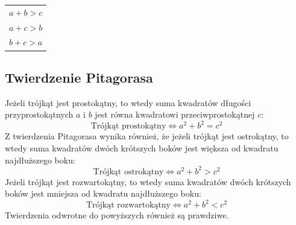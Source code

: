 \documentclass[14pt,a4paper]{extarticle}
\begin{document}
{%
   \renewcommand{\arraystretch}{1.4}
   \setlength\extrarowheight{9pt}
\begin{center}
   \begin{tabular}{>{\hspace{7cm}}c}
      $a + b > c$\\
      $a + c > b$\\
      $b + c > a$
   \end{tabular}   
\end{center}
}%
\MoveBelowBox

\newpage

\subsection{Twierdzenie Pitagorasa}
\noindent Jeżeli trójkąt jest prostokątny, to wtedy suma kwadratów długości przyprostokątnych $a$ i $b$
jest równa kwadratowi przeciwprostokątnej $c$:
$$\text{Trójkąt prostokątny} \Leftrightarrow a^{2} + b^{2} = c^{2}$$\hfill\break
\noindent Z twierdzenia Pitagorasa wynika również, że jeżeli trójkąt jest ostrokątny, to wtedy suma kwadratów
dwóch krótszych boków jest większa od kwadratu najdłuższego boku:
$$\text{Trójkąt ostrokątny} \Leftrightarrow a^{2} + b^{2} > c^{2}$$\hfill\break
\noindent Jeżeli trójkąt jest rozwartokątny, to wtedy suma kwadratów
dwóch krótszych boków jest mniejsza od kwadratu najdłuższego boku:
$$\text{Trójkąt rozwartokątny} \Leftrightarrow a^{2} + b^{2} < c^{2}$$\hfill\break
Twierdzenia odwrotne do powyższych również są prawdziwe.
\end{document}
